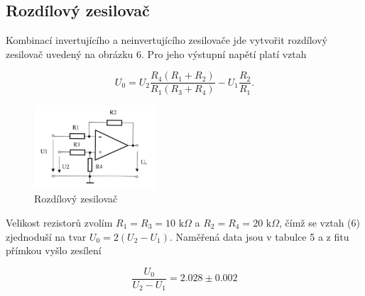 \documentclass[a4paper,11pt]{article}
\begin{document}
\newpage

\subsection{Rozdílový zesilovač}

Kombinací invertujícího a neinvertujícího zesilovače jde vytvořit rozdílový zesilovač uvedený na obrázku 6. Pro jeho výstupní napětí platí vztah

\begin{equation}
    U_0 = U_2 \frac{R_4 (R_1 + R_2)}{R_1 (R_3 + R_4)} - U_1 \frac{R_2}{R_1}.
\end{equation}

\begin{figure}[h]
    \centering
    \includegraphics[width=0.4\textwidth]{rozdilovy_sch.jpg}
    \caption{Rozdílový zesilovač}
\end{figure}

Velikost rezistorů zvolím $ R_1 = R_3 = 10 \text{ k} \Omega $ a $ R_2 = R_4 = 20 \text{ k}\Omega $, čímž se vztah (6) zjednoduší na tvar $ U_0 = 2(U_2 - U_1) $. Naměřená data jsou v tabulce 5 a z fitu přímkou vyšlo zesílení

\begin{equation}
\frac{U_0}{U_2 - U_1} =  2.028 \pm 0.002 
\end{equation}
\end{document}

